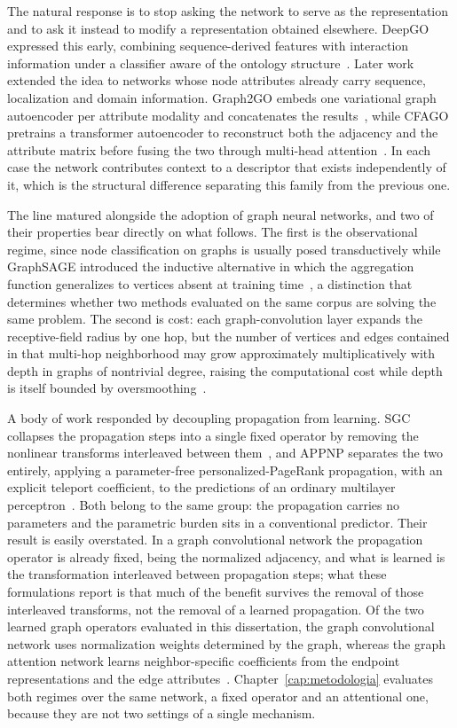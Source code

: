 \documentclass[Ingles]{ic-tese-v3}
\begin{document}
The natural response is to stop asking the network to serve as the representation and to ask it
instead to modify a representation obtained elsewhere. DeepGO expressed this early, combining
sequence-derived features with interaction information under a classifier aware of the ontology
structure~\cite{kulmanov2018deepgo}. Later work extended the idea to networks whose node attributes
already carry sequence, localization and domain information. Graph2GO embeds one variational graph
autoencoder per attribute modality and concatenates the results~\cite{fan2020graph2go}, while CFAGO
pretrains a transformer autoencoder to reconstruct both the adjacency and the attribute matrix before
fusing the two through multi-head attention~\cite{wu2023cfago}. In each case the network contributes
context to a descriptor that exists independently of it, which is the structural difference
separating this family from the previous one.

The line matured alongside the adoption of graph neural networks, and two of their properties bear
directly on what follows. The first is the observational regime, since node classification on graphs
is usually posed transductively while GraphSAGE introduced the inductive alternative in which the
aggregation function generalizes to vertices absent at training
time~\cite{yang2016revisiting,hamilton2017graphsage}, a distinction that determines whether two
methods evaluated on the same corpus are solving the same problem. The second is cost: each
graph-convolution layer expands the receptive-field radius by one hop, but the number of vertices
and edges contained in that multi-hop neighborhood may grow approximately multiplicatively with
depth in graphs of nontrivial degree, raising the computational cost while depth is itself bounded
by oversmoothing~\cite{li2018deeper,oono2020graph}.

A body of work responded by decoupling propagation from learning. SGC collapses the propagation
steps into a single fixed operator by removing the nonlinear transforms interleaved between
them~\cite{wu2019simplifying}, and APPNP separates the two entirely, applying a parameter-free
personalized-PageRank propagation, with an explicit teleport coefficient, to the predictions of an
ordinary multilayer perceptron~\cite{klicpera2019predict}. Both belong to the same group: the
propagation carries no parameters and the parametric burden sits in a conventional predictor. Their
result is easily overstated. In a graph convolutional network the propagation operator is already
fixed, being the normalized adjacency, and what is learned is the transformation interleaved between
propagation steps; what these formulations report is that much of the benefit survives the removal
of those interleaved transforms, not the removal of a learned propagation. Of the two learned
graph operators evaluated in this dissertation, the graph convolutional network uses normalization
weights determined by the graph, whereas the graph attention network learns neighbor-specific
coefficients from the endpoint representations and the edge attributes~\cite{velickovic2018graph}.
Chapter~\ref{cap:metodologia} evaluates both regimes over the same network, a fixed operator and an
attentional one, because they are not two settings of a single mechanism.
\end{document}
